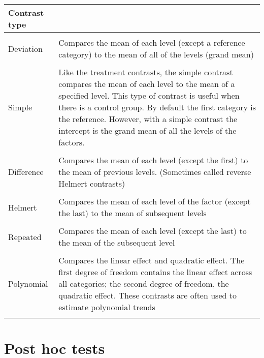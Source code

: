 \newpage
\begin{center}
\begin{tabular}{l|p{10cm}}
Contrast type &  \\ \hline \\
Deviation & Compares the mean of each level (except a reference category) to the mean of all of the levels (grand mean)\\ \\
Simple & Like the treatment contrasts, the simple contrast compares the mean of each level to the mean of a specified level. This type of contrast is useful when there is a control group. By default the first category is the reference. However, with a simple contrast the intercept is the grand mean of all the levels of the factors. \\ \\
Difference & Compares the mean of each level (except the first) to the mean of previous levels. (Sometimes called reverse Helmert contrasts) \\ \\
Helmert & Compares the mean of each level of the factor (except the last) to the mean of subsequent levels \\ \\
Repeated & Compares the mean of each level (except the last) to the mean of the subsequent level \\ \\
Polynomial & Compares the linear effect and quadratic effect. The first degree of freedom contains the linear effect across all categories; the second degree of freedom, the quadratic effect. These contrasts are often used to estimate polynomial trends \\ \\ \hline 
\end{tabular}
\end{center}


\section{Post hoc tests\label{sec:posthoc2}}

